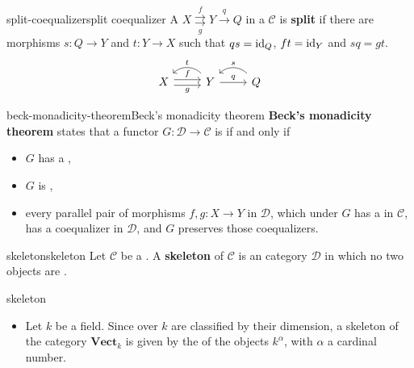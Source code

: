\begin{topic}{split-coequalizer}{split coequalizer}
    A  $X \overset{f}{\underset{g}{\rightrightarrows}} Y \xrightarrow{q} Q$ in a  $\mathcal{C}$ is \textbf{split} if there are morphisms $s \colon Q \to Y$ and $t \colon Y \to X$ such that $qs = \textup{id}_Q$, $ft = \textup{id}_Y$ and $sq = gt$.
    \[ \svg \begin{tikzcd} X \arrow[shift left=0.25em]{r}{f} \arrow[swap, shift right=0.25em]{r}{g} & Y \arrow{r}{q} \arrow[swap, bend right=45]{l}{t} & Q \arrow[swap, bend right=45]{l}{s} \end{tikzcd} \]
\end{topic}

\begin{topic}{beck-monadicity-theorem}{Beck's monadicity theorem}
    \textbf{Beck's monadicity theorem} states that a functor $G \colon \mathcal{D} \to \mathcal{C}$ is  if and only if
    \begin{itemize}
        \item $G$ has a ,
        \item $G$ is ,
        \item every parallel pair of morphisms $f, g \colon X \to Y$ in $\mathcal{D}$, which under $G$ has a  in $\mathcal{C}$, has a coequalizer in $\mathcal{D}$, and $G$ preserves those coequalizers.
    \end{itemize}
\end{topic}

\begin{topic}{skeleton}{skeleton}
    Let $\mathcal{C}$ be a . A \textbf{skeleton} of $\mathcal{C}$ is an  category $\mathcal{D}$ in which no two objects are . 
\end{topic}

\begin{example}{skeleton}
    \begin{itemize}
        \item Let $k$ be a field. Since  over $k$ are classified by their dimension, a skeleton of the category $\textbf{Vect}_k$ is given by the  of the objects $k^{\alpha}$, with $\alpha$ a cardinal number.
    \end{itemize}
\end{example}

